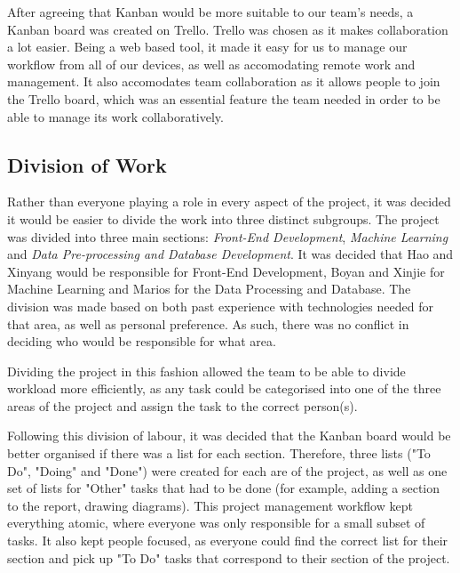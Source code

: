 \documentclass[titlepage]{article}
\begin{document}
After agreeing that Kanban would be more suitable to our team's needs, a Kanban board was created on Trello. Trello was chosen as it makes collaboration a lot easier. 
Being a web based tool, it made it easy for us to manage our workflow from all of our devices, as well as accomodating remote work and management. 
It also accomodates team collaboration as it allows people to join the Trello board, which was an essential feature the team needed in order to be able to manage its work collaboratively.

\subsection{Division of Work\label{work_division}}
Rather than everyone playing a role in every aspect of the project, it was decided it would be easier to divide the work into three distinct subgroups. 
The project was divided into three main sections: \textit{Front-End Development}, \textit{Machine Learning} and \textit{Data Pre-processing and Database Development}. 
It was decided that Hao and Xinyang would be responsible for Front-End Development, Boyan and Xinjie for Machine Learning and Marios for the Data Processing and Database. 
The division was made based on both past experience with technologies needed for that area, as well as personal preference. 
As such, there was no conflict in deciding who would be responsible for what area.

Dividing the project in this fashion allowed the team to be able to divide workload more efficiently, as any task could be categorised into one of the three areas of the project and assign the task to the correct person(s).

Following this division of labour, it was decided that the Kanban board would be better organised if there was a list for each section. 
Therefore, three lists ("To Do", "Doing" and "Done") were created for each are of the project, as well as one set of lists for "Other" tasks that had to be done (for example, adding a section to the report, drawing diagrams). 
This project management workflow kept everything atomic, where everyone was only responsible for a small subset of tasks. 
It also kept people focused, as everyone could find the correct list for their section and pick up "To Do" tasks that correspond to their section of the project.

\pagebreak
\printbibliography
\end{document}
